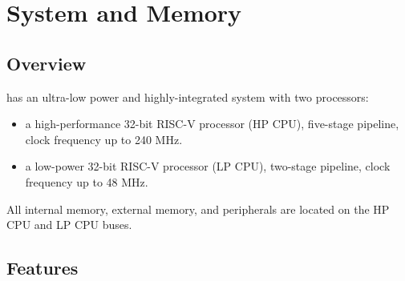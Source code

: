 \documentclass[main\_\_EN.tex]{subfiles}
\begin{document}

\ifglobal
\else
    \listoftodos
    {\let\clearpage\relax \listofdonetodos}
    \tableofcontents
\fi



\hypertarget{sysmem}{}
\chapter{System and Memory}
\label{mod:sysmem}

\section{Overview}

\chipname{} has an ultra-low power and highly-integrated system with two processors:
\begin{itemize}
    \item a high-performance 32-bit RISC-V processor (HP CPU), five-stage pipeline, clock frequency up to 240 MHz.
    \item a low-power 32-bit RISC-V processor (LP CPU), two-stage pipeline, clock frequency up to 48 MHz.
\end{itemize}
All internal memory, external memory, and peripherals are located on the HP CPU and LP CPU buses.
\section{Features}
\end{document}
